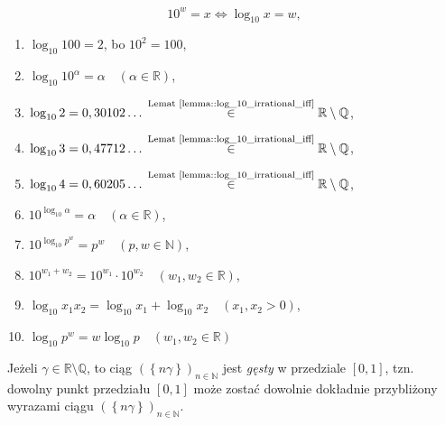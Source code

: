 \documentclass{beamer}
\newcommand{\enumsymbol}{$\triangleright$}
\newcommand{\R}{\mathbb{R}}
\newcommand{\Q}{\mathbb{Q}}
\newcommand{\N}{\mathbb{N}}
\newcommand{\define}[1]{\textit{#1}}
\newcommand{\paren}[1]{\!\left(#1 \right)}
\newcommand{\fracpart}[1]{\left\{ #1 \right\}}
\begin{document}
\begin{frame}
  $$10^w = x \iff \log_{10}x = w,$$
  \begin{enumerate}[label=\enumsymbol]
    \item $\log_{10}100 = 2$, bo $10^2 = 100$,
    \item $\log_{10}10^\alpha = \alpha \quad \paren{\alpha \in \R}$,
    \item $\log_{10}2 = 0,30102\ldots{} \stackrel{\text{Lemat~\ref{lemma::log_10_irrational_iff}}}{\in} \R \setminus \Q$,
    \item $\log_{10}3 = 0,47712\ldots{} \stackrel{\text{Lemat~\ref{lemma::log_10_irrational_iff}}}{\in} \R \setminus \Q$,
    \item $\log_{10}4 = 0,60205\ldots{} \stackrel{\text{Lemat~\ref{lemma::log_10_irrational_iff}}}{\in} \R \setminus \Q$,
    \item $10^{\log_{10}\alpha} = \alpha \quad \paren{\alpha \in \R}$,
    \item $10^{\log_{10}p^w} = p^w \quad \paren{p, w \in \N}$,
    \item $10^{w_1+w_2} = 10^{w_1} \cdot 10^{w_2} \quad \paren{w_1, w_2 \in \R}$,
    \item $\log_{10} x_1 x_2 = \log_{10}x_1+\log_{10}x_2 \quad \paren{x_1, x_2 > 0}$,
    \item $\log_{10}{p^w} = w \log_{10}p  \quad \paren{w_1, w_2 \in \R}$
  \end{enumerate}
\end{frame}

\begin{frame}
  \begin{theorem}
    \label{thm::fractional_part_of_multiples_of_irrational_numers_are_dense}
    Jeżeli $\gamma \in \R \setminus \Q$, to ciąg $\paren{\fracpart{n\gamma}}_{n \in \N}$ jest \define{gęsty} w przedziale $[0, 1]$,
    tzn. dowolny punkt przedziału $[0, 1]$ może zostać dowolnie dokładnie przybliżony wyrazami ciągu $\paren{\fracpart{n\gamma}}_{n \in \N}$.
  \end{theorem}
\end{frame}
\end{document}
